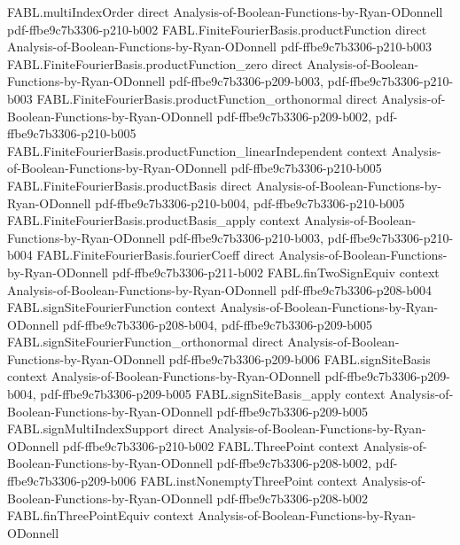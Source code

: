 \begin{theorem}
\proofstep
  {FABL.multiIndexOrder}
  {direct}
  {Analysis-of-Boolean-Functions-by-Ryan-ODonnell}
  {pdf-ffbe9c7b3306-p210-b002}
\proofstep
  {FABL.FiniteFourierBasis.productFunction}
  {direct}
  {Analysis-of-Boolean-Functions-by-Ryan-ODonnell}
  {pdf-ffbe9c7b3306-p210-b003}
\proofstep
  {FABL.FiniteFourierBasis.productFunction_zero}
  {direct}
  {Analysis-of-Boolean-Functions-by-Ryan-ODonnell}
  {pdf-ffbe9c7b3306-p209-b003,
    pdf-ffbe9c7b3306-p210-b003}
\proofstep
  {FABL.FiniteFourierBasis.productFunction_orthonormal}
  {direct}
  {Analysis-of-Boolean-Functions-by-Ryan-ODonnell}
  {pdf-ffbe9c7b3306-p209-b002,
    pdf-ffbe9c7b3306-p210-b005}
\proofstep
  {FABL.FiniteFourierBasis.productFunction_linearIndependent}
  {context}
  {Analysis-of-Boolean-Functions-by-Ryan-ODonnell}
  {pdf-ffbe9c7b3306-p210-b005}
\proofstep
  {FABL.FiniteFourierBasis.productBasis}
  {direct}
  {Analysis-of-Boolean-Functions-by-Ryan-ODonnell}
  {pdf-ffbe9c7b3306-p210-b004,
    pdf-ffbe9c7b3306-p210-b005}
\proofstep
  {FABL.FiniteFourierBasis.productBasis_apply}
  {context}
  {Analysis-of-Boolean-Functions-by-Ryan-ODonnell}
  {pdf-ffbe9c7b3306-p210-b003,
    pdf-ffbe9c7b3306-p210-b004}
\proofstep
  {FABL.FiniteFourierBasis.fourierCoeff}
  {direct}
  {Analysis-of-Boolean-Functions-by-Ryan-ODonnell}
  {pdf-ffbe9c7b3306-p211-b002}
\proofstep
  {FABL.finTwoSignEquiv}
  {context}
  {Analysis-of-Boolean-Functions-by-Ryan-ODonnell}
  {pdf-ffbe9c7b3306-p208-b004}
\proofstep
  {FABL.signSiteFourierFunction}
  {context}
  {Analysis-of-Boolean-Functions-by-Ryan-ODonnell}
  {pdf-ffbe9c7b3306-p208-b004,
    pdf-ffbe9c7b3306-p209-b005}
\proofstep
  {FABL.signSiteFourierFunction_orthonormal}
  {direct}
  {Analysis-of-Boolean-Functions-by-Ryan-ODonnell}
  {pdf-ffbe9c7b3306-p209-b006}
\proofstep
  {FABL.signSiteBasis}
  {context}
  {Analysis-of-Boolean-Functions-by-Ryan-ODonnell}
  {pdf-ffbe9c7b3306-p209-b004,
    pdf-ffbe9c7b3306-p209-b005}
\proofstep
  {FABL.signSiteBasis_apply}
  {context}
  {Analysis-of-Boolean-Functions-by-Ryan-ODonnell}
  {pdf-ffbe9c7b3306-p209-b005}
\proofstep
  {FABL.signMultiIndexSupport}
  {direct}
  {Analysis-of-Boolean-Functions-by-Ryan-ODonnell}
  {pdf-ffbe9c7b3306-p210-b002}
\proofstep
  {FABL.ThreePoint}
  {context}
  {Analysis-of-Boolean-Functions-by-Ryan-ODonnell}
  {pdf-ffbe9c7b3306-p208-b002,
    pdf-ffbe9c7b3306-p209-b006}
\proofstep
  {FABL.instNonemptyThreePoint}
  {context}
  {Analysis-of-Boolean-Functions-by-Ryan-ODonnell}
  {pdf-ffbe9c7b3306-p208-b002}
\proofstep
  {FABL.finThreePointEquiv}
  {context}
  {Analysis-of-Boolean-Functions-by-Ryan-ODonnell}

\end{theorem}
